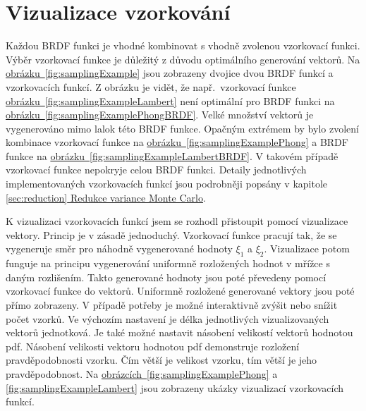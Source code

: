 \documentclass[czech,master]{diploma}
\newcommand{\randU}{\xi_{1}}
\newcommand{\randV}{\xi_{2}}
\begin{document}
\section{Vizualizace vzorkování} \label{sec:samplingViz}
Každou BRDF funkci je vhodné kombinovat s vhodně zvolenou vzorkovací funkci. Výběr vzorkovací funkce je důležitý z důvodu optimálního generování vektorů. Na \hyperref[fig:samplingExample]{obrázku~\ref{fig:samplingExample}} jsou zobrazeny dvojice dvou BRDF funkcí a vzorkovacích funkcí. Z obrázku je vidět, že např.\ vzorkovací funkce \hyperref[fig:samplingExampleLambert]{obrázku~\ref{fig:samplingExampleLambert}} není optimální pro  BRDF funkci na \hyperref[fig:samplingExamplePhongBRDF]{obrázku~\ref{fig:samplingExamplePhongBRDF}}. Velké množství vektorů je vygenerováno mimo lalok této BRDF funkce. Opačným extrémem by bylo zvolení kombinace vzorkovací funkce na \hyperref[fig:samplingExamplePhong]{obrázku~\ref{fig:samplingExamplePhong}} a BRDF funkce na \hyperref[fig:samplingExampleLambertBRDF]{obrázku~\ref{fig:samplingExampleLambertBRDF}}. V takovém případě vzorkovací funkce nepokryje celou BRDF funkci. Detaily jednotlivých implementovaných vzorkovacích funkcí jsou podrobněji popsány v kapitole \hyperref[sec:reduction]{\ref{sec:reduction} Redukce variance Monte Carlo}.\par
K vizualizaci vzorkovacích funkcí jsem se rozhodl přistoupit pomocí vizualizace vektory. Princip je v zásadě jednoduchý. Vzorkovací funkce pracují tak, že se vygeneruje směr pro náhodně vygenerované hodnoty \(\randU\) a \(\randV\). Vizualizace potom funguje na principu vygenerování uniformně rozložených hodnot v mřížce s daným rozlišením. Takto generované hodnoty jsou poté převedeny pomocí vzorkovací funkce do vektorů. Uniformně rozložené generované vektory jsou poté přímo zobrazeny. V případě potřeby je možné interaktivně zvýšit nebo snížit počet vzorků. Ve výchozím nastavení je délka jednotlivých vizualizovaných vektorů jednotková. Je také možné nastavit násobení velikostí vektorů hodnotou pdf. Násobení velikosti vektoru hodnotou pdf demonstruje rozložení pravděpodobnosti vzorku. Čím větší je velikost vzorku, tím větší je jeho pravděpodobnost. Na \hyperref[fig:samplingExamplePhong]{obrázcích~\ref{fig:samplingExamplePhong}} a \hyperref[fig:samplingExampleLambert]{\ref{fig:samplingExampleLambert}} jsou zobrazeny ukázky vizualizací vzorkovacích funkcí.
\end{document}
